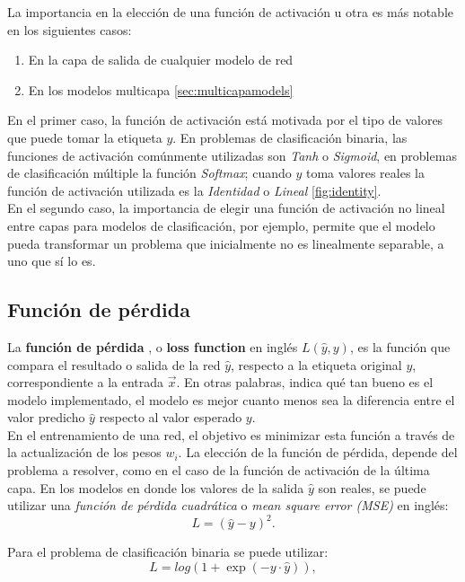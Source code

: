 La importancia en la elección de una función de activación u otra es más notable en los siguientes casos:
\begin{enumerate}
\item En la capa de salida de cualquier modelo de red
\item En los modelos multicapa \autoref{sec:multicapamodels}
\end{enumerate}
En el primer caso, la función de activación está motivada por el tipo de valores que puede tomar la etiqueta $y$. En problemas de clasificación binaria, las funciones de activación comúnmente utilizadas son \emph{Tanh} o \emph{Sigmoid}, en problemas de clasificación múltiple la función \emph{Softmax}; cuando $y$ toma valores reales la función de activación utilizada es la \emph{Identidad} o \emph{Lineal} \autoref{fig:identity}.
\\
En el segundo caso, la importancia de elegir una función de activación no lineal entre capas para modelos de clasificación, por ejemplo, permite que el modelo pueda transformar un problema que inicialmente no es linealmente separable, a uno que sí lo es.


\subsection{Función de pérdida}
La \textbf{función de pérdida} \cite{HINTON1989185}, o \textbf{loss function} en inglés $L(\hat{y},y)$, es la función que compara el resultado o salida de la red $\hat{y}$, respecto a la etiqueta original $y$, correspondiente a la entrada $\vec{x}$. En otras palabras, indica qué tan bueno es el modelo implementado, el modelo es mejor cuanto menos sea la diferencia entre el valor predicho $\hat{y}$ respecto al valor esperado $y$.
\\
En el entrenamiento de una red, el objetivo es minimizar esta función a través de la actualización de los pesos $w_i$. La elección de la función de pérdida, depende del problema a resolver, como en el caso de la función de activación de la última capa. En los modelos en donde los valores de la salida $\hat{y}$ son reales, se puede utilizar una \emph{función de pérdida cuadrática} o \emph{mean square error (MSE)} en inglés:
\begin{equation}
  \label{eq:MSE}
  L = (\hat{y}-y)^2.
\end{equation}

Para el problema de clasificación binaria se puede utilizar:
\begin{equation}
  \label{eq:bin}
  L = log(1 + \exp(−y\cdot \hat{y})),
\end{equation}

